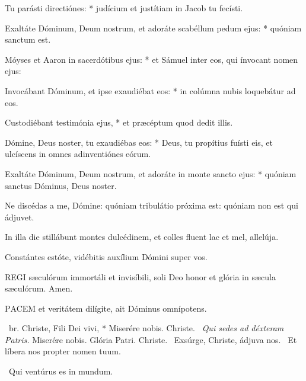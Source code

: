 Tu parásti directiónes: * judícium et justítiam in Jacob tu fecísti.

Exaltáte Dóminum, Deum nostrum, et adoráte scabéllum pedum ejus: * quóniam sanctum est.

Móyses et Aaron in sacerdótibus ejus: * et Sámuel inter eos, qui ínvocant nomen ejus:

Invocábant Dóminum, et ipse exaudiébat eos: * in colúmna nubis loquebátur ad eos.

Custodiébant testimónia ejus, * et præcéptum quod dedit illis.

Dómine, Deus noster, tu exaudiébas eos: * Deus, tu propítius fuísti eis, et ulcíscens in omnes adinventiónes eórum.

Exaltáte Dóminum, Deum nostrum, et adoráte in monte sancto ejus: * quóniam sanctus Dóminus, Deus noster.


  Ne discédas a me, Dómine: quóniam tribulátio próxima est: quóniam non est qui ádjuvet.


  In illa die stillábunt montes dulcédinem, et colles fluent lac et mel, allelúja.

  Constántes estóte, vidébitis auxílium Dómini super vos.



\lettrine[lines=2]{R}{EGI} sæculórum immortáli et invisíbili, soli Deo honor et glória in sæcula sæculórum. Amen.



\lettrine[lines=2]{P}{ACEM} et veritátem dilígite, ait Dóminus omnípotens.

\R\ br. Christe, Fili Dei vivi, * Miserére nobis. Christe. \V\ \textit{Qui sedes ad déxteram Patris.} Miserére nobis. Glória Patri. Christe. \V\ Exsúrge, Christe, ádjuva nos. \R\ Et líbera nos propter nomen tuum.

 \V\ Qui ventúrus es in mundum.


